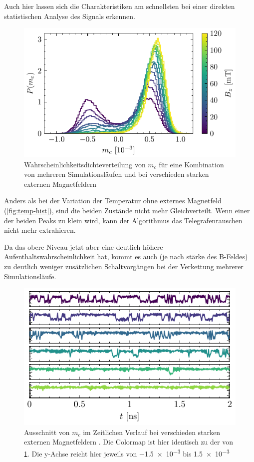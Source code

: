 \documentclass[main.tex]{subfiles}
\begin{document}
Auch hier lassen sich die Charakteristiken am schnellsten bei einer direkten statistischen Analyse des Signals erkennen.
  
\begin{figure}[H]
    \centering
    \includegraphics{bilder/plots/max_Bz/mc_hist.pdf}
    \caption{Wahrscheinlichkeitsdichteverteilung von \(m_c\) für eine Kombination von mehreren Simulationsläufen und bei verschieden starken externen Magnetfeldern}\label{fig:b-hist}    
\end{figure}

Anders als bei der Variation der Temperatur ohne externes Magnetfeld (\cref{fig:temp-hist}), sind die beiden Zustände nicht mehr Gleichverteilt. Wenn einer der beiden Peaks zu klein wird, kann der Algorithmus das Telegrafenrauschen nicht mehr extrahieren. 

Da das obere Niveau jetzt aber eine deutlich höhere Aufenthaltswahrscheinlichkeit hat, kommt es auch (je nach stärke des B-Feldes) zu deutlich weniger zusätzlichen Schaltvorgängen bei der Verkettung mehrerer Simulationsläufe.


\begin{figure}[H]
    \centering
    \includegraphics{bilder/plots/max_Bz/mc_time.pdf}
    \caption{Ausschnitt von \(m_c\) im Zeitlichen Verlauf bei verschieden starken externen Magnetfeldern . Die Colormap ist hier identisch zu der von \cref{fig:b-hist}. Die y-Achse reicht hier jeweils von \num{-1.5e-3} bis \num{+1.5e-3}}\label{fig:b-time}    
\end{figure}
\end{document}
